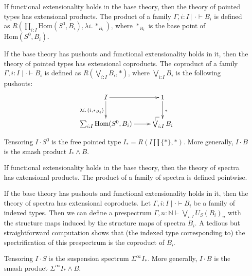 \documentclass[reqno]{mscs}
\makeatletter
\newcommand{\fs}[1]{\mathrm{#1}}
\newcommand{\Hom}{\fs{Hom}}
\numberwithin{figure}{section}
\newcommand{\po}[1][dr]{\save*!/#1+1.2pc/#1:(1,-1)@^{|-}\restore}
\makeatother
\begin{document}
\begin{example}
If functional extensionality holds in the base theory, then the theory of pointed types has extensional products.
The product of a family $\Gamma, i : I \mid \cdot \vdash B_i$ is defined as $R(\prod_{i : I} \Hom(S^0,B_i), \lambda i.\,*_{B_i})$, where $*_{B_i}$ is the base point of $\Hom(S^0,B_i)$.
\end{example}

\begin{example}
If the base theory has pushouts and functional extensionality holds in it, then the theory of pointed types has extensional coproducts.
The coproduct of a family $\Gamma, i : I \mid \cdot \vdash B_i$ is defined as $R(\bigvee_{i : I} B_i, *)$, where $\bigvee_{i : I} B_i$ is the following pushouts:
\[ \xymatrix{ I                           \ar[r] \ar[d]_{\lambda i.\,(i,*_{B_i})} & 1 \ar[d]^{*} \\
              \sum_{i : I} \Hom(S^0, B_i) \ar[r]                                  & \po \bigvee_{i : I} B_i
            } \]
\end{example}

\begin{example}
Tensoring $I \cdot S^0$ is the free pointed type $I_* = R(I \amalg \{ * \}, *)$.
More generally, $I \cdot B$ is the smash product $I_* \wedge B$.
\end{example}

\begin{example}
If functional extensionality holds in the base theory, then the theory of spectra has extensional products.
The product of a family of spectra is defined pointwise.
\end{example}

\begin{example}
If the base theory has pushouts and functional extensionality holds in it, then the theory of spectra has extensional coproducts.
Let $\Gamma, i : I \mid \cdot \vdash B_i$ be a family of indexed types.
Then we can define a prespectrum $\Gamma, n : \mathbb{N} \vdash \bigvee_{i : I} U_S(B_i)_n$ with the structure maps induced by the structure maps of spectra $B_i$.
A tedious but straightforward computation shows that (the indexed type corresponding to) the spectrification of this prespectrum is the coproduct of $B_i$.
\end{example}

\begin{example}
Tensoring $I \cdot S$ is the suspension spectrum $\Sigma^\infty I_*$.
More generally, $I \cdot B$ is the smash product $\Sigma^\infty I_* \wedge B$.
\end{example}
\end{document}

